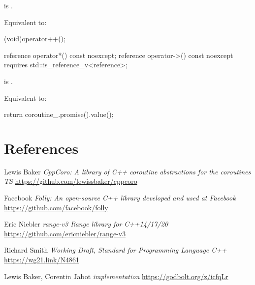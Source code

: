\documentclass{wg21}
\begin{document}
\begin{addedblock}
\begin{itemdescr}
    \precondition {} is .
    
    \effects
    Equivalent to:
    \begin{codeblock}
         (void)operator++();
    \end{codeblock}
\end{itemdescr}


\begin{itemdecl}
reference operator*() const noexcept;
reference operator->() const noexcept requires std::is_reference_v<reference>;
\end{itemdecl}

\begin{itemdescr}
    \precondition {} is .
    
    \effects
    Equivalent to:
    \begin{codeblock}
        return coroutine_.promise().value();
    \end{codeblock}
\end{itemdescr}



\end{addedblock}
    

\section{References}
\renewcommand{\section}[2]{}%



\begin{thebibliography}{9}
    Lewis Baker
    \emph{CppCoro: A library of C++ coroutine abstractions for the coroutines TS}\newline
    \url{https://github.com/lewissbaker/cppcoro}
    
    Facebook
    \emph{Folly: An open-source C++ library developed and used at Facebook}\newline
    \url{https://github.com/facebook/folly}
    
    
    Eric Niebler
    \emph{range-v3 Range library for C++14/17/20}\newline
    \url{https://github.com/ericniebler/range-v3}

    
    Richard Smith
    \emph{Working Draft, Standard for Programming Language C++}\newline
    \url{https://wg21.link/N4861}
    
    
    Lewis Baker, Corentin Jabot
    \emph{ implementation}\newline
    \url{https://godbolt.org/z/icfqLr}
    
\end{thebibliography}
\end{document}
